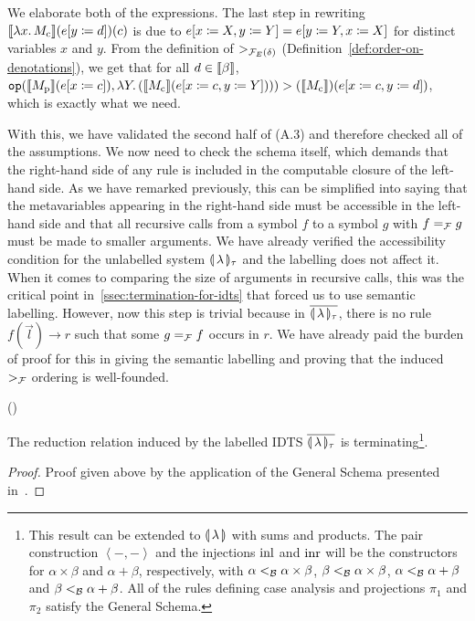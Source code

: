 We elaborate both of the expressions. The last step in rewriting
$\llbracket \lambda x.\, M_{\mathrm{c}} \rrbracket(e[y \coloneqq d])(c)$ is due to
$e[x \coloneqq X, y \coloneqq Y] = e[y \coloneqq Y, x \coloneqq X]$ for distinct variables
$x$ and $y$. From the definition of $>_{\mathcal{F}_E(\delta)}$
(Definition~\ref{def:order-on-denotations}), we get that for all
$d \in \llbracket \beta \rrbracket$,
$\mathtt{op}(\llbracket M_{\mathrm{p}} \rrbracket(e[x \coloneqq c]),
\lambda Y.\, (\llbracket M_{\mathrm{c}} \rrbracket(e[x \coloneqq c, y \coloneqq Y]))) >
(\llbracket M_{\mathrm{c}} \rrbracket)(e[x \coloneqq c, y \coloneqq d])$, which is exactly what we need.

With this, we have validated the second half of (A.3) and therefore checked
all of the assumptions. We now need to check the schema itself, which
demands that the right-hand side of any rule is included in the computable
closure of the left-hand side. As we have remarked previously, this can be
simplified into saying that the metavariables appearing in the right-hand
side must be accessible in the left-hand side and that all recursive calls
from a symbol $f$ to a symbol $g$ with $f =_{\mathcal{F}} g$ must be made to smaller
arguments. We have already verified the accessibility condition for the
unlabelled system ${\llparenthesis \, \lambda \, \rrparenthesis_\tau}$ and the labelling does not affect it. When it
comes to comparing the size of arguments in recursive calls, this was the
critical point in~\ref{ssec:termination-for-idts} that forced us to use
semantic labelling. However, now this step is trivial because in
${\overline{\llparenthesis \, \lambda \, \rrparenthesis_\tau}}$, there is no rule $f(\vec{l}) \to r$ such that some $g =_{\mathcal{F}} f$
occurs in $r$. We have already paid the burden of proof for this in giving
the semantic labelling and proving that the induced $>_{\mathcal{F}}$ ordering is
well-founded.

\begin{theorem}\label{thm:labidts-termination}
  ()

  The reduction relation induced by the labelled IDTS ${\overline{\llparenthesis \, \lambda \, \rrparenthesis_\tau}}$ is
  terminating\footnote{This result can be extended to $\llparenthesis \, \lambda \, \rrparenthesis$
    with sums and products. The pair construction $\left<-,-\right>$ and
    the injections $\operatorname{inl}$ and $\operatorname{inr}$ will be the constructors for
    $\alpha \times \beta$ and $\alpha + \beta$, respectively, with
    $\alpha <_{\mathcal{B}} \alpha \times \beta$, $\beta <_{\mathcal{B}} \alpha \times \beta$,
    $\alpha <_{\mathcal{B}} \alpha + \beta$ and $\beta <_{\mathcal{B}} \alpha + \beta$. All of
    the rules defining case analysis and projections $\pi_1$ and $\pi_2$
    satisfy the General Schema.}.
\end{theorem}

\begin{proof}
  Proof given above by the application of the General Schema presented
  in~\cite{blanqui2000termination}.
\end{proof}

